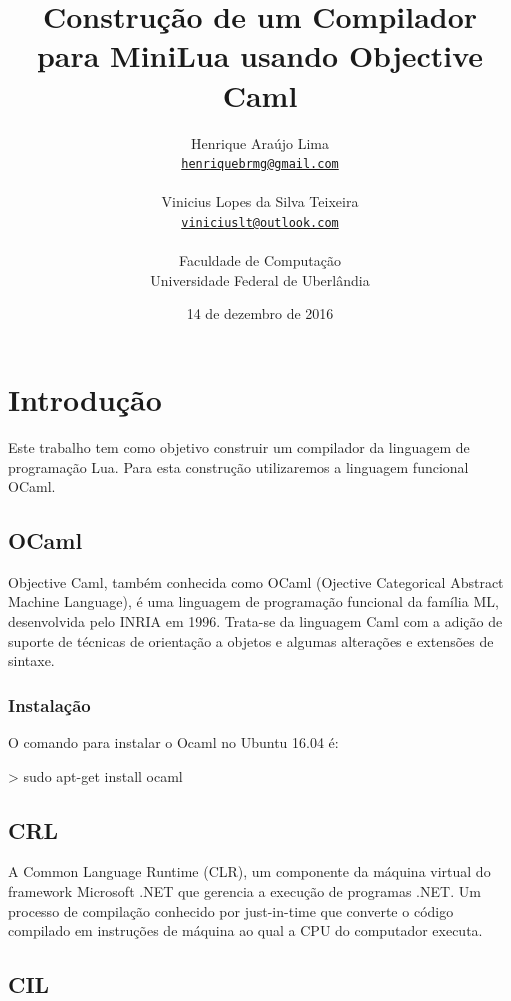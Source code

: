 \documentclass[12pt,a4paper]{report}
\title{Construção de um Compilador para MiniLua usando Objective Caml}
\date{}
\author{Henrique Araújo Lima \\
\texttt{\small \url{henriquebrmg@gmail.com}}\\ \\
Vinicius Lopes da Silva Teixeira \\
\texttt{\small \url{viniciuslt@outlook.com}}\\ 
\vspace{1cm} \\
Faculdade de Computação \\
Universidade Federal de Uberlândia
}
\date{14 de dezembro de 2016}
\begin{document}
  \maketitle


\tableofcontents    





\setlength{\parskip}{0.15in} %

\chapter{Introdução}
Este trabalho tem como objetivo construir um compilador da linguagem de programação Lua. Para esta construção utilizaremos a linguagem funcional OCaml.

\section{OCaml}
Objective Caml, também conhecida como OCaml (Ojective Categorical Abstract Machine Language), é uma linguagem de programação funcional da família ML, desenvolvida pelo INRIA em 1996. Trata-se da linguagem Caml com a adição de suporte de técnicas de orientação a objetos e algumas alterações e extensões de sintaxe.

\subsection{Instalação}
O comando para instalar o Ocaml no Ubuntu 16.04 é:
\begin{terminal}
> sudo apt-get install ocaml
\end{terminal}

\section{CRL}
A Common Language Runtime (CLR), um componente da máquina virtual do framework Microsoft .NET que gerencia a execução de programas .NET. Um processo de compilação conhecido por just-in-time que converte o código compilado em instruções de máquina ao qual a CPU do computador executa.

\section{CIL}
\end{document}
